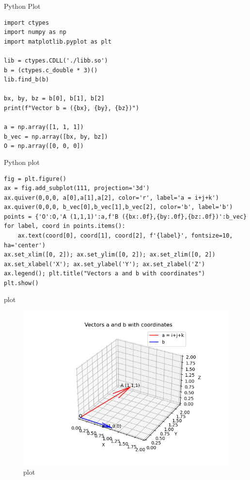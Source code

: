 \documentclass{beamer}
\begin{document}
\begin{frame}[fragile]{Python Plot}
\lstset{language=Python}
\begin{lstlisting}
import ctypes
import numpy as np
import matplotlib.pyplot as plt

lib = ctypes.CDLL('./libb.so')
b = (ctypes.c_double * 3)()
lib.find_b(b)

bx, by, bz = b[0], b[1], b[2]
print(f"Vector b = ({bx}, {by}, {bz})")

a = np.array([1, 1, 1])
b_vec = np.array([bx, by, bz])
O = np.array([0, 0, 0])

\end{lstlisting}
\end{frame}
\begin{frame}[fragile]{Python plot}
\lstset{language=C}
\begin{lstlisting}
fig = plt.figure()
ax = fig.add_subplot(111, projection='3d')
ax.quiver(0,0,0, a[0],a[1],a[2], color='r', label='a = i+j+k')
ax.quiver(0,0,0, b_vec[0],b_vec[1],b_vec[2], color='b', label='b')
points = {'O':O,'A (1,1,1)':a,f'B ({bx:.0f},{by:.0f},{bz:.0f})':b_vec}
for label, coord in points.items():
    ax.text(coord[0], coord[1], coord[2], f'{label}', fontsize=10, ha='center')
ax.set_xlim([0, 2]); ax.set_ylim([0, 2]); ax.set_zlim([0, 2])
ax.set_xlabel('X'); ax.set_ylabel('Y'); ax.set_zlabel('Z')
ax.legend(); plt.title("Vectors a and b with coordinates")
plt.show()
\end{lstlisting}
\end{frame}
\begin{frame}{plot}
\begin{figure}[H]
\centering
\includegraphics[width=0.75\columnwidth]{figs/5.png}
\caption{\centering plot}
\label{fig:placeholder_125}
\end{figure}
\end{frame}
\end{document}
